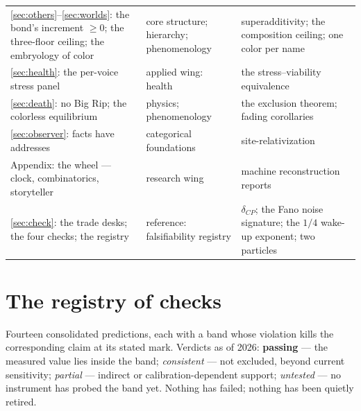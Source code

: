 \documentclass[11pt,letterpaper]{article}
\begin{document}
\begin{center}
\begin{tabular}{@{}p{}p{}p{}@{}}
\ref{sec:others}--\ref{sec:worlds}: the bond's increment $\geq 0$;
the three-floor ceiling; the embryology of color & core structure;
hierarchy; phenomenology & superadditivity; the composition
ceiling; one color per name \\[2pt]
\ref{sec:health}: the per-voice stress panel & applied wing:
health & the stress--viability equivalence \\[2pt]
\ref{sec:death}: no Big Rip; the colorless equilibrium & physics;
phenomenology & the exclusion theorem; fading corollaries \\[2pt]
\ref{sec:observer}: facts have addresses & categorical
foundations & site-relativization \\[2pt]
Appendix: the wheel --- clock, combinatorics,
storyteller & research wing & machine reconstruction reports \\[2pt]
\ref{sec:check}: the trade desks; the four checks; the registry &
reference: falsifiability registry & $\delta_{CP}$; the Fano noise
signature; the $1/4$ wake-up exponent; two particles \\
\bottomrule
\end{tabular}
\end{center}

\clearpage
\section*{The registry of checks}

Fourteen consolidated predictions, each with a band whose violation
kills the corresponding claim at its stated mark. Verdicts as of
2026: \textbf{passing} --- the measured value lies inside the band;
\emph{consistent} --- not excluded, beyond current sensitivity;
\emph{partial} --- indirect or calibration-dependent support;
\emph{untested} --- no instrument has probed the band yet. Nothing
has failed; nothing has been quietly retired.
\end{document}
